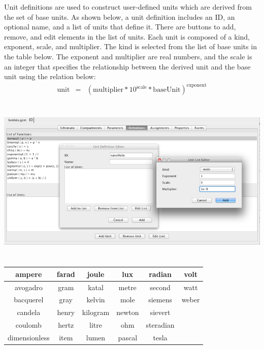 \documentclass[titlepage,11pt]{article}
\begin{document}
\noindent
Unit definitions are used to construct user-defined units which are derived from the set of base units.  As shown below, a unit definition includes an ID, an optional name, and a list of units that define it.  There are buttons to add, remove, and edit elements in the list of units.  Each unit is composed of a kind, exponent, scale, and multiplier.  The kind is selected from the list of base units in the table below.  The exponent and multiplier are real numbers, and the scale is an integer that specifies the relationship between the derived unit and the base unit using the relation below:
\begin{eqnarray*}
\mathrm{unit} & = & (\mathrm{multiplier} * 10^\mathrm{scale} * \mathrm{baseUnit})^\mathrm{exponent}
\end{eqnarray*}

\begin{center}
\includegraphics[height=80mm]{screenshots/units}
\end{center}

\begin{center}
\begin{tabular}{|c|c|c|c|c|c|}
\hline
ampere        & farad  & joule    & lux  & radian    & volt \\ \hline
avogadro     & gram  & katal   & metre   & second   & watt \\ \hline
bacquerel       & gray & kelvin & mole & siemens   & weber \\ \hline
candela       & henry & kilogram    & newton    & sievert & ~\\ \hline
coulomb & hertz  & litre    & ohm & steradian     & ~\\ \hline
dimensionless         & item & lumen      & pascal & tesla      & ~\\ \hline
\end{tabular}
\end{center}
\end{document}
